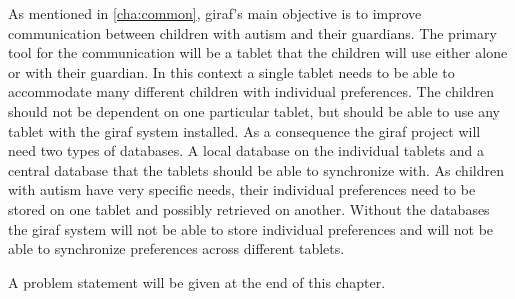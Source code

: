 As mentioned in \autoref{cha:common}, \ac{giraf}'s main objective is to improve communication between children
with autism and their guardians. The primary tool for the communication will be a tablet that the children will
use either alone or with their guardian. In this context a single tablet needs to be able to accommodate many
different children with individual preferences. The children should not be dependent on one particular tablet, but
should be able to use any tablet with the \ac{giraf} system installed. 
As a consequence the \ac{giraf} project will need two types of databases. A local database on the individual
tablets and a central database that the tablets should be able to synchronize with. As children with autism have
very specific needs, their individual preferences need to be stored on one tablet and possibly retrieved on
another. Without the databases the \ac{giraf} system will not be able to store individual preferences and will not
be able to synchronize preferences across different tablets.

A problem statement will be given at the end of this chapter.